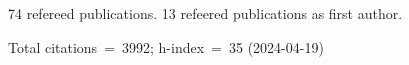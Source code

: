 74 refereed publications. 13 refeered publications as first author.

Total citations~=~3992; h-index~=~35 (2024-04-19)